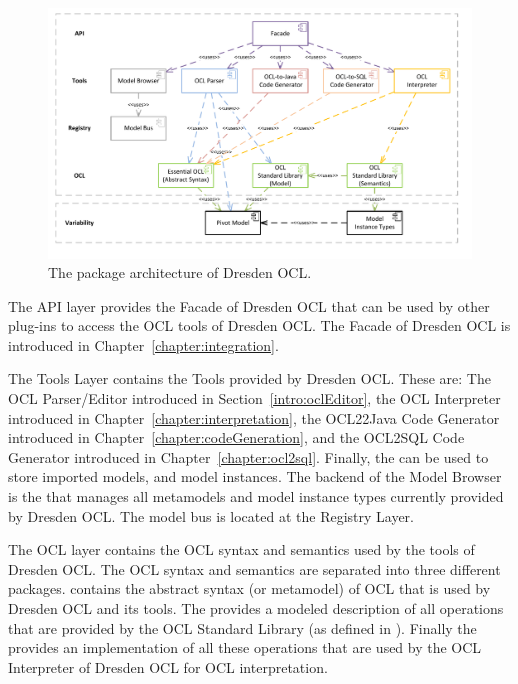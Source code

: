 \begin{figure}[!b]
	\centering
	\includegraphics[width=1.0\linewidth]{figures/architecture/modules}
	\caption{The package architecture of Dresden OCL.}
	\label{pic:architecture:modules}
\end{figure}

The API layer provides the Facade of Dresden OCL that can be used by other
plug-ins to access the OCL tools of Dresden OCL. The Facade of Dresden OCL
is introduced in Chapter~\ref{chapter:integration}.

The Tools Layer contains the Tools provided by Dresden OCL. These are: The
OCL Parser/Editor introduced in Section~\ref{intro:oclEditor}, the OCL
Interpreter introduced in Chapter~\ref{chapter:interpretation}, the OCL22Java
Code Generator introduced in Chapter~\ref{chapter:codeGeneration}, and the
OCL2SQL Code Generator introduced in Chapter~\ref{chapter:ocl2sql}. Finally, the
 can be used to store imported models, and model
instances. The backend of the Model Browser is the  that
manages all metamodels and model instance types currently provided by Dresden
OCL. The model bus is located at the Registry Layer.

The OCL layer contains the OCL syntax and semantics used by the tools of Dresden
OCL. The OCL syntax and semantics are separated into three different packages.
 contains the abstract syntax (or metamodel) of OCL that
is used by Dresden OCL and its tools. The 
provides a modeled description of all operations that are provided by the OCL
Standard Library (as defined in \cite[Ch.~11]{spec:OCL2-3}). Finally the
 provides an implementation of all
these operations that are used by the OCL Interpreter of Dresden OCL for OCL 
interpretation.

